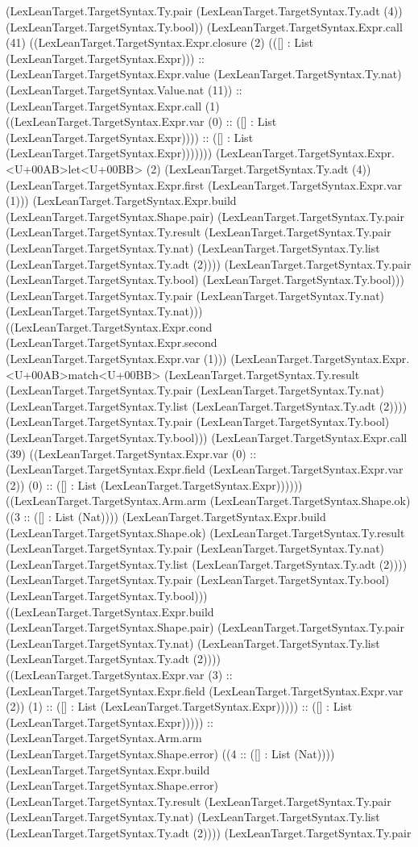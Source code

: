 \documentclass[11pt]{article}
\begin{document}
(LexLeanTarget.TargetSyntax.Ty.pair (LexLeanTarget.TargetSyntax.Ty.adt (4)) (LexLeanTarget.TargetSyntax.Ty.bool)) (LexLeanTarget.TargetSyntax.Expr.call (41) ((LexLeanTarget.TargetSyntax.Expr.closure (2) (([] : List (LexLeanTarget.TargetSyntax.Expr))) :: (LexLeanTarget.TargetSyntax.Expr.value (LexLeanTarget.TargetSyntax.Ty.nat) (LexLeanTarget.TargetSyntax.Value.nat (11)) :: (LexLeanTarget.TargetSyntax.Expr.call (1) ((LexLeanTarget.TargetSyntax.Expr.var (0) :: ([] : List (LexLeanTarget.TargetSyntax.Expr)))) :: ([] : List (LexLeanTarget.TargetSyntax.Expr))))))) (LexLeanTarget.TargetSyntax.Expr.<U+00AB>let<U+00BB> (2) (LexLeanTarget.TargetSyntax.Ty.adt (4)) (LexLeanTarget.TargetSyntax.Expr.first (LexLeanTarget.TargetSyntax.Expr.var (1))) (LexLeanTarget.TargetSyntax.Expr.build (LexLeanTarget.TargetSyntax.Shape.pair) (LexLeanTarget.TargetSyntax.Ty.pair (LexLeanTarget.TargetSyntax.Ty.result (LexLeanTarget.TargetSyntax.Ty.pair (LexLeanTarget.TargetSyntax.Ty.nat) (LexLeanTarget.TargetSyntax.Ty.list (LexLeanTarget.TargetSyntax.Ty.adt (2)))) (LexLeanTarget.TargetSyntax.Ty.pair (LexLeanTarget.TargetSyntax.Ty.bool) (LexLeanTarget.TargetSyntax.Ty.bool))) (LexLeanTarget.TargetSyntax.Ty.pair (LexLeanTarget.TargetSyntax.Ty.nat) (LexLeanTarget.TargetSyntax.Ty.nat))) ((LexLeanTarget.TargetSyntax.Expr.cond (LexLeanTarget.TargetSyntax.Expr.second (LexLeanTarget.TargetSyntax.Expr.var (1))) (LexLeanTarget.TargetSyntax.Expr.<U+00AB>match<U+00BB> (LexLeanTarget.TargetSyntax.Ty.result (LexLeanTarget.TargetSyntax.Ty.pair (LexLeanTarget.TargetSyntax.Ty.nat) (LexLeanTarget.TargetSyntax.Ty.list (LexLeanTarget.TargetSyntax.Ty.adt (2)))) (LexLeanTarget.TargetSyntax.Ty.pair (LexLeanTarget.TargetSyntax.Ty.bool) (LexLeanTarget.TargetSyntax.Ty.bool))) (LexLeanTarget.TargetSyntax.Expr.call (39) ((LexLeanTarget.TargetSyntax.Expr.var (0) :: (LexLeanTarget.TargetSyntax.Expr.field (LexLeanTarget.TargetSyntax.Expr.var (2)) (0) :: ([] : List (LexLeanTarget.TargetSyntax.Expr)))))) ((LexLeanTarget.TargetSyntax.Arm.arm (LexLeanTarget.TargetSyntax.Shape.ok) ((3 :: ([] : List (Nat)))) (LexLeanTarget.TargetSyntax.Expr.build (LexLeanTarget.TargetSyntax.Shape.ok) (LexLeanTarget.TargetSyntax.Ty.result (LexLeanTarget.TargetSyntax.Ty.pair (LexLeanTarget.TargetSyntax.Ty.nat) (LexLeanTarget.TargetSyntax.Ty.list (LexLeanTarget.TargetSyntax.Ty.adt (2)))) (LexLeanTarget.TargetSyntax.Ty.pair (LexLeanTarget.TargetSyntax.Ty.bool) (LexLeanTarget.TargetSyntax.Ty.bool))) ((LexLeanTarget.TargetSyntax.Expr.build (LexLeanTarget.TargetSyntax.Shape.pair) (LexLeanTarget.TargetSyntax.Ty.pair (LexLeanTarget.TargetSyntax.Ty.nat) (LexLeanTarget.TargetSyntax.Ty.list (LexLeanTarget.TargetSyntax.Ty.adt (2)))) ((LexLeanTarget.TargetSyntax.Expr.var (3) :: (LexLeanTarget.TargetSyntax.Expr.field (LexLeanTarget.TargetSyntax.Expr.var (2)) (1) :: ([] : List (LexLeanTarget.TargetSyntax.Expr))))) :: ([] : List (LexLeanTarget.TargetSyntax.Expr))))) :: (LexLeanTarget.TargetSyntax.Arm.arm (LexLeanTarget.TargetSyntax.Shape.error) ((4 :: ([] : List (Nat)))) (LexLeanTarget.TargetSyntax.Expr.build (LexLeanTarget.TargetSyntax.Shape.error) (LexLeanTarget.TargetSyntax.Ty.result (LexLeanTarget.TargetSyntax.Ty.pair (LexLeanTarget.TargetSyntax.Ty.nat) (LexLeanTarget.TargetSyntax.Ty.list (LexLeanTarget.TargetSyntax.Ty.adt (2)))) (LexLeanTarget.TargetSyntax.Ty.pair 
\end{document}
